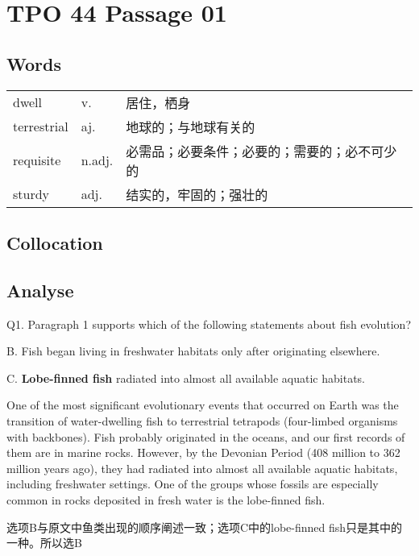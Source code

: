 \section{TPO 44 Passage 01}

\subsection{Words}

\begin{tabular}{lll}
    dwell       & v.     & 居住，栖身                  \\
    terrestrial & aj.    & 地球的；与地球有关的             \\
    requisite   & n.adj. & 必需品；必要条件；必要的；需要的；必不可少的 \\
    sturdy      & adj.   & 结实的，牢固的；强壮的            \\
\end{tabular}

\subsection{Collocation}

\newpage

\subsection{Analyse}

\begin{blk}
    \begin{qst}
        Q1. Paragraph 1 supports which of the following statements about fish evolution?
    \end{qst}

    \begin{chc}
        B. Fish began living in freshwater habitats only after originating elsewhere.

        C. \textbf{Lobe-finned fish} radiated into almost all available aquatic habitats.
    \end{chc}

    \begin{psgq}
        One of the most significant evolutionary events that occurred on Earth was the transition of water-dwelling fish to terrestrial tetrapods (four-limbed organisms with backbones). Fish probably originated in the oceans, and our first records of them are in marine rocks. However, by the Devonian Period (408 million to 362 million years ago), they had radiated into almost all available aquatic habitats, including freshwater settings. One of the groups whose fossils are especially common in rocks deposited in fresh water is the lobe-finned fish.
    \end{psgq}

    \begin{nlz}
        选项B与原文中鱼类出现的顺序阐述一致；选项C中的lobe-finned fish只是其中的一种。所以选B
    \end{nlz}
\end{blk}

